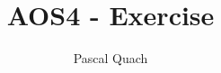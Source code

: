 \documentclass[answers, 10pt]{exam}
\begin{document}
\title{AOS4 - Exercise}
\author{Pascal Quach}
\maketitle

\lipsum[1]

\begin{questions}
	\question 
	\lipsum[1]

	\begin{solutionorbox}
	\lipsum[1]
	\end{solutionorbox}

\end{questions}
\end{document}
